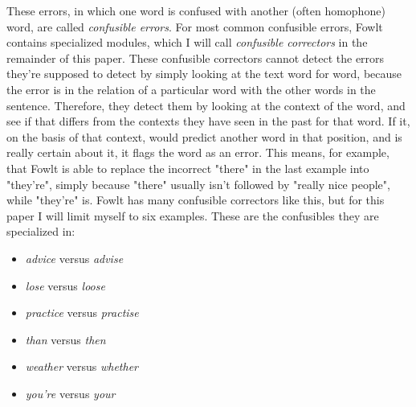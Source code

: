 \documentclass[12pt]{article}
\begin{document}
These errors, in which one word is confused with another (often homophone) word, are called \emph{confusible errors}. For most common confusible errors, Fowlt contains specialized modules, which I will call \emph{confusible correctors} in the remainder of this paper. These confusible correctors cannot detect the errors they're supposed to detect by simply looking at the text word for word, because the error is in the relation of a particular word with the other words in the sentence. Therefore, they detect them by looking at the context of the word, and see if that differs from the contexts they have seen in the past for that word. If it, on the basis of that context, would predict another word in that position, and is really certain about it, it flags the word as an error. This means, for example, that Fowlt is able to replace the incorrect "there" in the last example into "they're", simply because "there" usually isn't followed by "really nice people", while "they're" is. Fowlt has many confusible correctors like this, but for this paper I will limit myself to six examples. These are the confusibles they are specialized in: 

\begin{itemize}
\item \emph{advice} versus \emph{advise}
\item \emph{lose} versus \emph{loose}
\item \emph{practice} versus \emph{practise}
\item \emph{than} versus \emph{then}
\item \emph{weather} versus \emph{whether}
\item \emph{you're} versus \emph{your}
\end{itemize}
\end{document}

